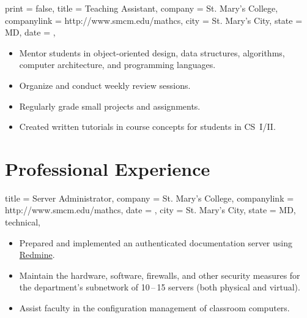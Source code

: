 \documentclass{simplecv}
\begin{document}
\begin{position}
  {
    print   = false,
    title   = Teaching Assistant,
    company = St. Mary's College,
    companylink = http://www.smcm.edu/mathcs,
    city    = St. Mary's City,
    state   = MD,
    date    = ,
  }

\begin{itemize}
\item Mentor students in object-oriented design, data structures, algorithms, computer architecture, and programming languages.
\item Organize and conduct weekly review sessions.
\item Regularly grade small projects and assignments.
\item Created written tutorials in course concepts for students in CS~I\slash II.
\end{itemize}
\end{position}

\vfill
\section{Professional Experience}

\begin{position}
  {
    title   = Server Administrator,
    company = St. Mary's College,
    companylink = http://www.smcm.edu/mathcs,
    date    = ,
    city    = St. Mary's City,
    state   = MD,
    technical,
  }

\begin{itemize}
\item Prepared and implemented an authenticated documentation server using \href{http://www.redmine.org}{Redmine}.
\item Maintain the hardware, software, firewalls, and other security measures
  for the department's subnetwork of 10\,--\,15 servers (both physical and virtual).
\item Assist faculty in the configuration management of classroom computers.
\end{itemize}
\end{position}
\end{document}
